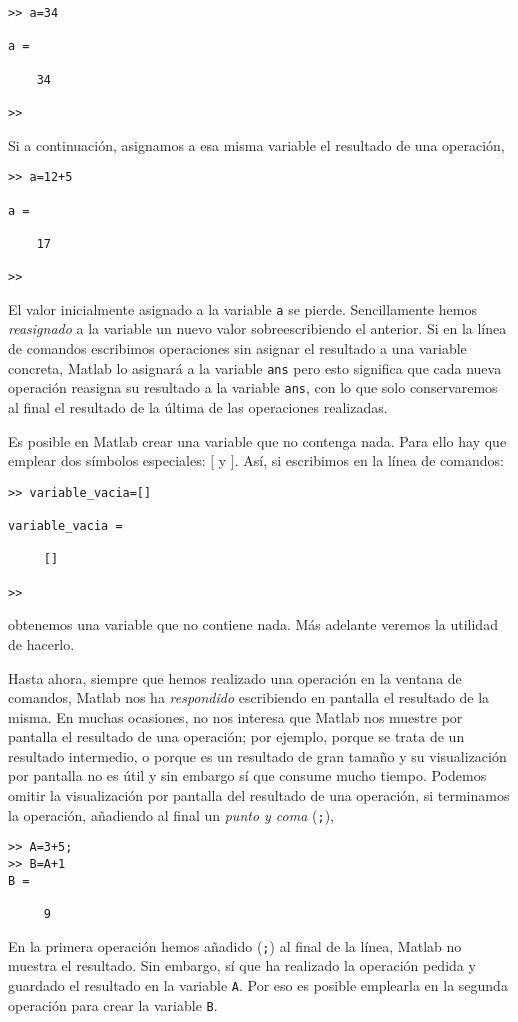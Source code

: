 \begin{verbatim}
>> a=34

a =

    34

>> 
\end{verbatim}
Si a continuación, asignamos a esa misma variable el resultado de una operación,
\begin{verbatim}
>> a=12+5

a =

    17

>> 
\end{verbatim}
El valor inicialmente asignado a la variable \texttt{a} se pierde. Sencillamente hemos \emph{reasignado} a la variable un nuevo valor sobreescribiendo el anterior. Si en la línea de comandos escribimos operaciones sin asignar el resultado a una variable concreta, Matlab lo asignará a la variable \texttt{ans} pero esto significa que cada nueva operación reasigna su resultado a la variable \texttt{ans}, con lo que solo conservaremos al final el resultado de la última de las operaciones realizadas.

Es posible en Matlab crear una variable que no contenga nada. Para ello hay que emplear dos símbolos especiales: $[$ y $]$. Así, si escribimos en la línea de comandos:
\begin{verbatim}
>> variable_vacia=[]

variable_vacia =

     []

>> 
\end{verbatim}
obtenemos una variable que no contiene nada. Más adelante veremos la utilidad de hacerlo.

Hasta ahora, siempre que hemos realizado una operación en la ventana de comandos, Matlab nos ha \emph{respondido} escribiendo en pantalla el resultado de la misma. En muchas ocasiones, no nos interesa que Matlab nos muestre por pantalla el resultado de una operación; por ejemplo, porque se trata de un resultado intermedio, o porque es un resultado de gran tamaño y su visualización por pantalla no es útil y sin embargo sí que consume mucho tiempo. Podemos omitir la visualización por pantalla del resultado de una operación, si terminamos la operación, añadiendo al final un \emph{punto y coma} (\texttt{;}),

\begin{verbatim}
>> A=3+5;
>> B=A+1
B =

     9

\end{verbatim}
En la primera operación hemos añadido (\texttt{;}) al final de la línea, Matlab no muestra el resultado. Sin embargo, sí que ha realizado la operación pedida y guardado el resultado en la variable \texttt{A}. Por eso es posible emplearla en la segunda operación para crear la variable \texttt{B}.
